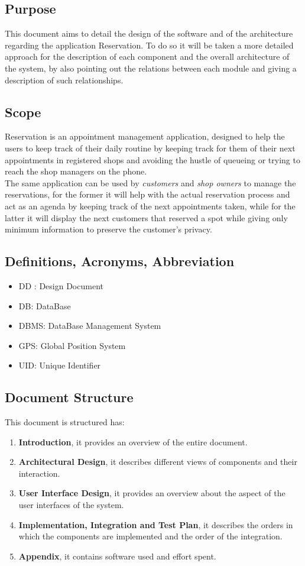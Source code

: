 \subsection{Purpose}
This document aims to detail the design of the software and of the architecture regarding the application Reservation.
To do so it will be taken a more detailed approach for the description of each component and the overall architecture of the system, by also pointing out the relations between each module and giving a description of such relationships.

\subsection{Scope}
Reservation is an appointment management application, designed to help the users to keep track of their daily routine by keeping track for them of their next appointments in registered shops and avoiding the hustle of queueing or trying to reach the shop managers on the phone.\\
The same application can be used by \textit{customers} and \textit{shop owners} to manage the reservations, for the former it will help with the actual reservation process and act as an agenda by keeping track of the next appointments taken, while for the latter it will display the next customers that reserved a spot while giving only minimum information to preserve the customer's privacy.

\subsection{Definitions, Acronyms, Abbreviation}
\begin{itemize}
\item DD : Design Document
\item DB: DataBase
\item DBMS: DataBase Management System
\item GPS: Global Position System
\item UID: Unique Identifier
\end{itemize}

\subsection{Document Structure}
This document is structured has:
\begin{enumerate}
	\item \textbf{Introduction}, it provides an overview of the entire document.
	\item \textbf{Architectural Design}, it describes different views of components and their interaction.
	\item \textbf{User Interface Design}, it provides an overview about the aspect of the user interfaces of the system.
	\item \textbf{Implementation, Integration and Test Plan}, it describes the orders in which the components are implemented and the order of the integration.
	\item \textbf{Appendix}, it contains software used and effort spent.
\end{enumerate}



